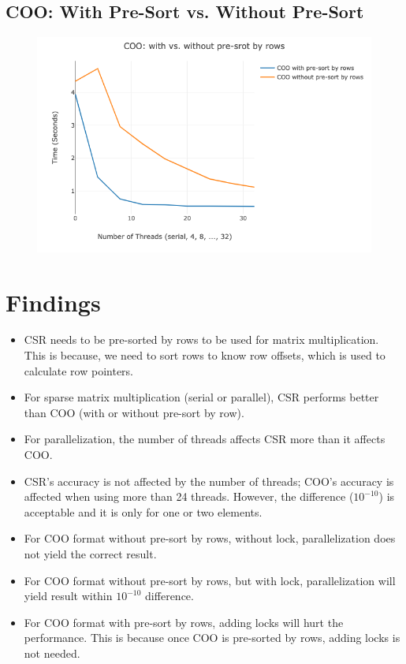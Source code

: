 \documentclass[a4paper,11pt,BCOR10mm,oneside,headsepline]{scrartcl}
\begin{document}
	\subsection{COO: With Pre-Sort vs. Without Pre-Sort}
		\begin{figure}[!htbp]
			\centering
			\includegraphics[scale=0.4]{./figures/coo_sort}
		\end{figure}

	\section{Findings}
		\begin{itemize}
			\item CSR needs to be pre-sorted by rows to be used for matrix multiplication. This is because, we need to sort rows to know row offsets, which is used to calculate row pointers.
			\item For sparse matrix multiplication (serial or parallel), CSR performs better than COO (with or without pre-sort by row).
			\item For parallelization, the number of threads affects CSR more than it affects COO.
			\item CSR's accuracy is not affected by the number of threads; COO's accuracy is affected when using more than 24 threads. However, the difference (\(10^{-10}\)) is acceptable and it is only for one or two elements.
			\item For COO format without pre-sort by rows, without lock, parallelization does not yield the correct result.
			\item For COO format without pre-sort by rows, but with lock, parallelization will yield result within \(10^{-10}\) difference.
			\item For COO format with pre-sort by rows, adding locks will hurt the performance. This is because once COO is pre-sorted by rows, adding locks is not needed.
		\end{itemize}
	
\end{document}
